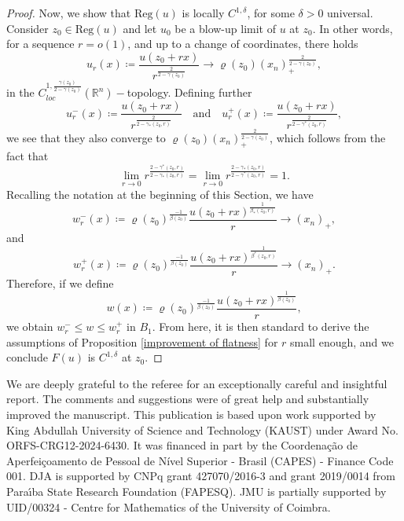 \documentclass[reqno,11pt]{amsart}
\newcommand{\reg}{\text{Reg}}
\newcommand{\1}{\mathds{1}}
\numberwithin{equation}{section}
\begin{document}
\begin{proof}
Now, we show that $\reg(u)$ is locally $C^{1,\delta}$, for some $\delta>0$ universal. Consider $z_0 \in \reg(u)$ and let $u_0$ be a blow-up limit of $u$ at $z_0$. In other words, for a sequence $r=o(1)$, and  up to a change of coordinates, there holds
$$
    u_r(x) \coloneqq \frac{u(z_0 + rx)}{r^{\frac{2}{2-\gamma(z_0)}}} \longrightarrow \varrho(z_0) (x_n)_+^{\frac{2}{2-\gamma(z_0)}},
$$
in the  $C_{loc}^{1,\frac{\gamma(z_0)}{2-\gamma(z_0)}}(\mathbb{R}^n)-$topology. Defining further
$$
	u^-_r(x) \coloneqq \frac{u(z_0 + rx)}{r^{\frac{2}{2-\gamma_\ast(z_0,r)}}} \quad \text{and} \quad u^+_r(x) \coloneqq \frac{u(z_0 + rx)}{r^{\frac{2}{2-\gamma^\ast(z_0,r)}}},
$$
we see that they also converge to $\varrho(z_0) (x_n)_+^{\frac{2}{2-\gamma(z_0)}}$, which follows from the fact that
$$
	\lim_{r \to 0} r^{\frac{2-\gamma^\ast(z_0,r)}{2-\gamma_\ast(z_0,r)}} = \lim_{r \to 0} r^{\frac{2-\gamma_\ast(z_0,r)}{2-\gamma^\ast(z_0,r)}} = 1.
$$
Recalling the notation at the beginning of this Section, we have
$$
	w^-_r(x) \coloneqq \varrho(z_0)^{\frac{-1}{\beta(z_0)}}\frac{u(z_0 + rx)^{\frac{1}{\beta_\ast(z_0,r)}}}{r} \longrightarrow (x_n)_+,
$$
and
$$
	w^+_r(x) \coloneqq \varrho(z_0)^{\frac{-1}{\beta(z_0)}}\frac{u(z_0 + rx)^{\frac{1}{\beta^\ast(z_0,r)}}}{r} \longrightarrow (x_n)_+.
$$
Therefore, if we define
$$
	w(x) \coloneqq \varrho(z_0)^{\frac{-1}{\beta(z_0)}}\frac{u(z_0 + rx)^{\frac{1}{\beta(z_0)}}}{r},
$$
we obtain $w^-_r \leq w \leq w^+_r$ in $B_1$. From here, it is then standard to derive the assumptions of Proposition \ref{improvement of flatness} for $r$ small enough, and we conclude $F(u)$ is $C^{1,\delta}$ at $z_0$.
\end{proof}

\bigskip

{\small {} We are deeply grateful to the referee for an exceptionally careful and insightful report. The comments and suggestions were of great help and substantially improved the manuscript. This publication is based upon work supported by King Abdullah University of Science and Technology (KAUST) under Award No. ORFS-CRG12-2024-6430. It was financed in part by the Coordenação de Aperfeiçoamento de Pessoal de Nível Superior - Brasil (CAPES) - Finance Code 001. DJA is supported by CNPq grant 427070/2016-3 and grant 2019/0014 from Para\'\i ba State Research Foundation (FAPESQ). JMU is partially supported by UID/00324 - Centre for Mathematics of the University of Coimbra.}

\bigskip


\end{document}
